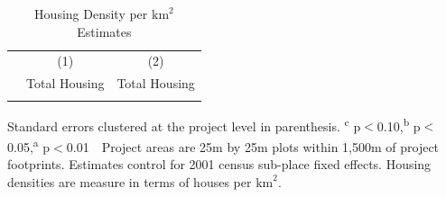 \documentclass[12pt]{article}
\begin{document}
\begin{table}
\small
\centering
\caption{Housing Density per $\text{km}^{2}$ Estimates}\label{table:bbluDDDfull}
\vspace{-2mm}
\begin{threeparttable}
\begin{tabular}{lCC}
\toprule
& \small (1) & \small (2) \\
 & \small Total Housing & \small Total Housing \\ \midrule
 \\[-.5em]

\bottomrule
\end{tabular}
\begin{tablenotes}
\item \footnotesize Standard errors clustered at the project level in parenthesis. \textsuperscript{c} p$<$0.10,\textsuperscript{b} p$<$0.05,\textsuperscript{a} p$<$0.01 \,\,
Project areas are 25m by 25m plots within 1,500m of project footprints.
Estimates control for 2001 census sub-place fixed effects.
Housing densities are measure in terms of houses per $\text{km}^{2}$.
\end{tablenotes}
\end{threeparttable}
\end{table}


\begin{table}[hbt!]
\small
\centering
\caption{Housing Density per $\text{km}^{2}$ Estimates}\label{table:bbluDDDfull}
\vspace{-2mm}
\end{table}
\end{document}
